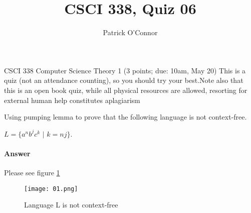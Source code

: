 \documentclass{article}
\title{CSCI 338, Quiz 06}
\author{Patrick O'Connor}
\begin{document}
\maketitle

CSCI 338 Computer Science Theory
1 (3 points; due: 10am, May 20)
This is a quiz (not an attendance counting), so you should 
try your best.Note also that this is an open book quiz, 
while all physical resources are allowed, resorting for external human 
help constitutes aplagiarism


Using pumping lemma to prove that the following language is not context-free.

$L = \{a^n b^j c^k$ $|$ $k=nj\}$.

\paragraph{Answer}

Please see figure \ref{fig:num01}
\begin{figure}
    \texttt{[image: 01.png]}
    \caption{Language L is not context-free}
    \label{fig:num01}
\end{figure}
\end{document}
